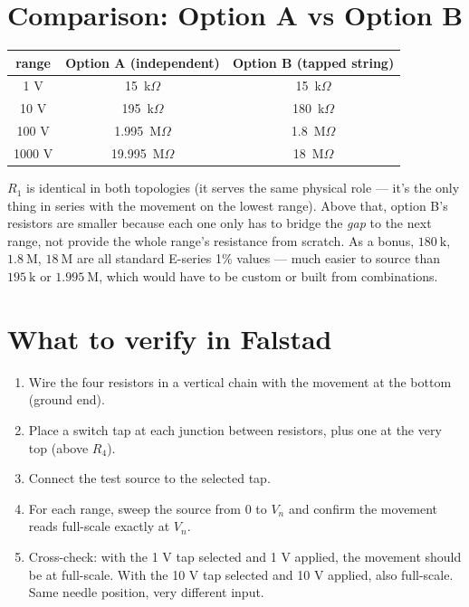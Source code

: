 \documentclass[11pt,a4paper]{article}
\begin{document}
\section*{Comparison: Option A vs Option B}

\begin{center}
\begin{tabular}{ccc}
\toprule
range & Option A (independent) & Option B (tapped string) \\
\midrule
1 V    & 15\ k$\Omega$       & 15\ k$\Omega$    \\
10 V   & 195\ k$\Omega$      & 180\ k$\Omega$   \\
100 V  & 1.995\ M$\Omega$    & 1.8\ M$\Omega$   \\
1000 V & 19.995\ M$\Omega$   & 18\ M$\Omega$    \\
\bottomrule
\end{tabular}
\end{center}

$R_1$ is identical in both topologies (it serves the same physical role --- it's the only thing in series with the movement on the lowest range). Above that, option B's resistors are smaller because each one only has to bridge the \emph{gap} to the next range, not provide the whole range's resistance from scratch. As a bonus, $180\ \text{k}$, $1.8\ \text{M}$, $18\ \text{M}$ are all standard E-series 1\% values --- much easier to source than $195\ \text{k}$ or $1.995\ \text{M}$, which would have to be custom or built from combinations.

\section*{What to verify in Falstad}

\begin{enumerate}[leftmargin=1.5em]
  \item Wire the four resistors in a vertical chain with the movement at the bottom (ground end).
  \item Place a switch tap at each junction between resistors, plus one at the very top (above $R_4$).
  \item Connect the test source to the selected tap.
  \item For each range, sweep the source from 0 to $V_n$ and confirm the movement reads full-scale exactly at $V_n$.
  \item Cross-check: with the 1 V tap selected and 1 V applied, the movement should be at full-scale. With the 10 V tap selected and 10 V applied, also full-scale. Same needle position, very different input.
\end{enumerate}
\end{document}
